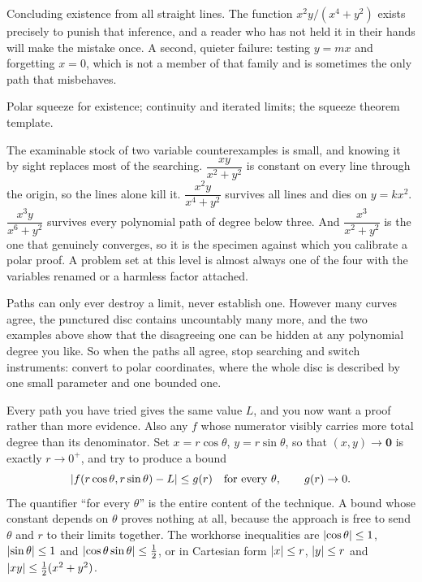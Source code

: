 \begin{trap}
Concluding existence from all straight lines. The function $x^{2}y/(x^{4}+y^{2})$ exists precisely to punish that inference, and a reader who has not held it in their hands will make the mistake once. A second, quieter failure: testing $y=mx$ and forgetting $x=0$, which is not a member of that family and is sometimes the only path that misbehaves.
\end{trap}

\begin{seealsob}Polar squeeze for existence; continuity and iterated limits; the squeeze theorem template.\end{seealsob}

\begin{keynote}
The examinable stock of two variable counterexamples is small, and knowing it by sight replaces most of the searching. $\dfrac{xy}{x^{2}+y^{2}}$ is constant on every line through the origin, so the lines alone kill it. $\dfrac{x^{2}y}{x^{4}+y^{2}}$ survives all lines and dies on $y=kx^{2}$. $\dfrac{x^{3}y}{x^{6}+y^{2}}$ survives every polynomial path of degree below three. And $\dfrac{x^{3}}{x^{2}+y^{2}}$ is the one that genuinely converges, so it is the specimen against which you calibrate a polar proof. A problem set at this level is almost always one of the four with the variables renamed or a harmless factor attached.
\end{keynote}

Paths can only ever destroy a limit, never establish one. However many curves agree, the punctured disc contains uncountably many more, and the two examples above show that the disagreeing one can be hidden at any polynomial degree you like. So when the paths all agree, stop searching and switch instruments: convert to polar coordinates, where the whole disc is described by one small parameter and one bounded one.

\cue Every path you have tried gives the same value $L$, and you now want a proof rather than more evidence. Also any $f$ whose numerator visibly carries more total degree than its denominator.
\method Set $x=r\cos\theta$, $y=r\sin\theta$, so that $(x,y)\to\mathbf 0$ is exactly $r\to0^{+}$, and try to produce a bound
\[\left\lvert f(r\cos\theta,r\sin\theta)-L\right\rvert\leq g(r)\quad\text{for every }\theta,\qquad g(r)\to0 .\]
The quantifier ``for every $\theta$'' is the entire content of the technique. A bound whose constant depends on $\theta$ proves nothing at all, because the approach is free to send $\theta$ and $r$ to their limits together. The workhorse inequalities are $\left\lvert \cos\theta\right\rvert\leq1$, $\left\lvert \sin\theta\right\rvert\leq1$ and $\left\lvert \cos\theta\sin\theta\right\rvert\leq\tfrac12$, or in Cartesian form $\left\lvert x\right\rvert\leq r$, $\left\lvert y\right\rvert\leq r$ and $\left\lvert xy\right\rvert\leq\tfrac12(x^{2}+y^{2})$.

